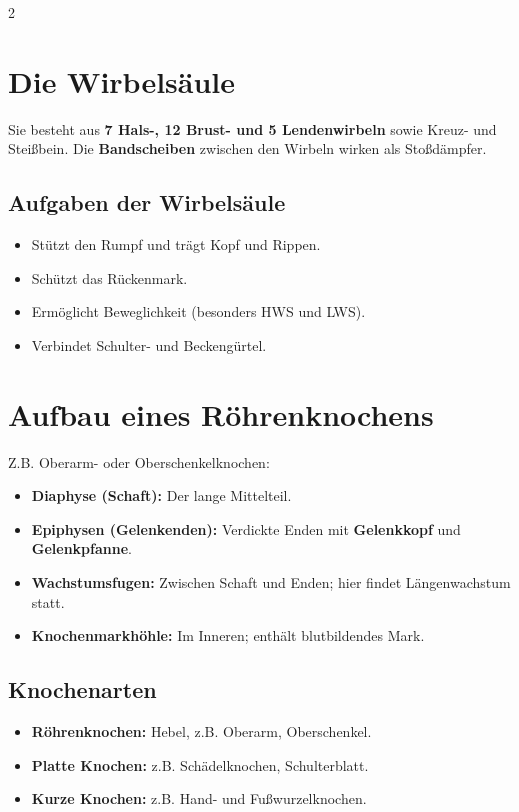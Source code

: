 \documentclass[12pt,a4paper]{article}
\begin{document}
\begin{multicols}{2}
		\section*{Die Wirbelsäule}
		Sie besteht aus \textbf{7 Hals-, 12 Brust- und 5 Lendenwirbeln} sowie Kreuz- und Steißbein. 
		Die \textbf{Bandscheiben} zwischen den Wirbeln wirken als Stoßdämpfer.
		
		\subsection*{Aufgaben der Wirbelsäule}
		\begin{itemize}[noitemsep]
			\item Stützt den Rumpf und trägt Kopf und Rippen.
			\item Schützt das Rückenmark.
			\item Ermöglicht Beweglichkeit (besonders HWS und LWS).
			\item Verbindet Schulter- und Beckengürtel.
		\end{itemize}
		
		\section*{Aufbau eines Röhrenknochens}
		Z.B. Oberarm- oder Oberschenkelknochen:
		\begin{itemize}[noitemsep]
			\item \textbf{Diaphyse (Schaft):} Der lange Mittelteil.
			\item \textbf{Epiphysen (Gelenkenden):} Verdickte Enden mit \textbf{Gelenkkopf} und \textbf{Gelenkpfanne}.
			\item \textbf{Wachstumsfugen:} Zwischen Schaft und Enden; hier findet Längenwachstum statt.
			\item \textbf{Knochenmarkhöhle:} Im Inneren; enthält blutbildendes Mark.
		\end{itemize}
		
		\subsection*{Knochenarten}
		\begin{itemize}[noitemsep]
			\item \textbf{Röhrenknochen:} Hebel, z.B. Oberarm, Oberschenkel.
			\item \textbf{Platte Knochen:} z.B. Schädelknochen, Schulterblatt.
			\item \textbf{Kurze Knochen:} z.B. Hand- und Fußwurzelknochen.
		\end{itemize}
		

\end{multicols}
\end{document}
